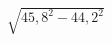 \begin{ex}[type=calculate]
	\begin{condition}
		\( \sqrt{45,8^2-44,2^2} \)
	\end{condition}
\end{ex}